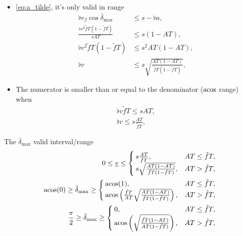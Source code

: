 \begin{itemize}
\item
\eqref{eq:a_tilde}, it's only valid in range
\begin{align*}
\flat{v}_f \cos\bar{\delta}_{\max} &\le s - \flat{a},\\
\frac{\flat{v}^2 \tilde{f}T(1 - \tilde{f}T)}{sAT} &\le s(1 - AT),\\
\flat{v}^2 \tilde{f}T(1 - \tilde{f}T) &\le s^2 AT(1 - AT),\\
\flat{v} &\le s \sqrt{\frac{AT(1 - AT)}{\tilde{f}T(1 - \tilde{f}T)}},
\end{align*}

\item
The numerator is smaller than or equal to the denominator ($\operatorname{acos}$ range) when
\begin{align*}
\flat{v} \tilde{f}T \le sAT,\\
\flat{v} \le s \frac{AT}{\tilde{f}T},
\end{align*}
\end{itemize}

The $\bar{\delta}_{\max}$ valid interval/range
\begin{align*}
0 \le \flat{v} \le
\begin{cases}
s \frac{AT}{\tilde{f}T}, & AT \le \tilde{f}T,\\
s \sqrt{\frac{AT(1 - AT)}{\tilde{f}T(1 - \tilde{f}T)}}, &AT > \tilde{f}T,
\end{cases}\\
\acos(0) \ge \bar{\delta}_{\max} \ge
\begin{cases}
\acos(1), & AT \le \tilde{f}T,\\
\acos\left( \frac{\tilde{f}T}{AT} \sqrt{\frac{AT(1 - AT)}{\tilde{f}T(1 - \tilde{f}T)}} \right), &AT > \tilde{f}T,
\end{cases}\\
\frac{\pi}{2} \ge \bar{\delta}_{\max} \ge
\begin{cases}
0, & AT \le \tilde{f}T,\\
\acos\left( \sqrt{\frac{\tilde{f}T(1 - AT)}{AT(1 - \tilde{f}T)}} \right), &AT > \tilde{f}T,
\end{cases}
\end{align*}


